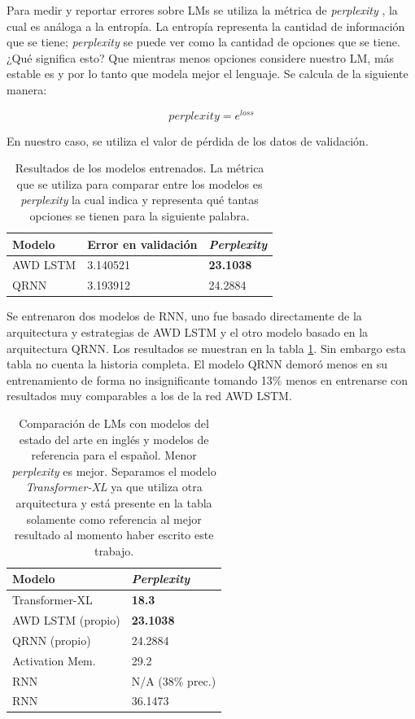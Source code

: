 Para medir y reportar errores sobre LMs se utiliza la métrica de \textit{perplexity} \parencite{jurafsky2014speech}, la cual es análoga a la entropía. La entropía representa la cantidad de información que se tiene; \textit{perplexity} se puede ver como la cantidad de opciones que se tiene. ¿Qué significa esto? Que mientras menos opciones considere nuestro LM, más estable es y por lo tanto que modela mejor el lenguaje. Se calcula de la siguiente manera:

$$ perplexity = e^{loss} $$

En nuestro caso, se utiliza el valor de pérdida de los datos de validación.

\begin{table}
\centering
\begin{tabular}{|l|l|l|}
\hline
Modelo & Error en validación & \textit{Perplexity} \\
\hline
AWD LSTM & 3.140521 & \textbf{23.1038} \\
QRNN & 3.193912 & 24.2884 \\
\hline
\end{tabular}
\caption{Resultados de los modelos entrenados. La métrica que se utiliza para comparar entre los modelos es \textit{perplexity} la cual indica y representa qué tantas opciones se tienen para la siguiente palabra.}
\label{tab:modresults}
\end{table}

Se entrenaron dos modelos de RNN, uno fue basado directamente de la arquitectura y estrategias de AWD LSTM  y el otro modelo basado en la arquitectura QRNN. Los resultados se muestran en la tabla \ref{tab:modresults}. Sin embargo esta tabla no cuenta la historia completa. El modelo QRNN demoró menos en su entrenamiento de forma no insignificante tomando 13\% menos en entrenarse con resultados muy comparables a los de la red AWD LSTM.

\begin{table}
\centering
\begin{tabular}{|l|l|}
\hline
\textbf{Modelo} & \textbf{\textit{Perplexity}} \\
\hline
Transformer-XL \parencite{dai2019} & \textbf{18.3} \\
\hline
AWD LSTM (propio) & \textbf{23.1038} \\
QRNN (propio) & 24.2884 \\
Activation Mem. \parencite{rae2018} & 29.2 \\
RNN \parencite{goldszmidt2018} & N/A (38\% prec.) \\
RNN \parencite{ingham2018} & 36.1473 \\
\hline

\end{tabular}
\caption{Comparación de LMs con modelos del estado del arte en inglés y modelos de referencia para el español. Menor \textit{perplexity} es mejor. Separamos el modelo \textit{Transformer-XL} ya que utiliza otra arquitectura y está presente en la tabla solamente como referencia al mejor resultado al momento haber escrito este trabajo.}
\label{tab:lmcomp}
\end{table}

